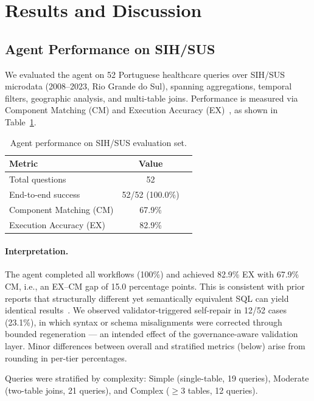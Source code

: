\documentclass[sigconf,natbib=false]{acmart}
\begin{document}
\section{Results and Discussion}
\label{sec:results}

\subsection{Agent Performance on SIH/SUS}
\label{sec:results-agent}

We evaluated the agent on 52 Portuguese healthcare queries over SIH/SUS microdata (2008--2023, Rio Grande do Sul), spanning aggregations, temporal filters, geographic analysis, and multi-table joins. Performance is measured via Component Matching (CM) and Execution Accuracy (EX)~\cite{yu2018spider}, as shown in Table~\ref{tab:agent_results}.


\begin{table}[H]
\centering
\caption{Agent performance on SIH/SUS evaluation set.}
\label{tab:agent_results}
\begin{tabular}{lcc}
\toprule
\textbf{Metric} & \textbf{Value} \\
\midrule
Total questions & 52 \\
End-to-end success & 52/52 (100.0\%) \\
Component Matching (CM) & 67.9\% \\
Execution Accuracy (EX) & 82.9\% \\
\bottomrule
\end{tabular}
\end{table}

  \paragraph{Interpretation.}
The agent completed all workflows (100\%) and achieved 82.9\% EX with 67.9\% CM, i.e., an EX--CM gap of 15.0 percentage points. This is consistent with prior reports that structurally different yet semantically equivalent SQL can yield identical results~\cite{yu2018spider}. We observed validator-triggered self-repair in 12/52 cases (23.1\%), in which syntax or schema misalignments were corrected through bounded regeneration — an intended effect of the governance-aware validation layer. Minor differences between overall and stratified metrics (below) arise from rounding in per-tier percentages.


Queries were stratified by complexity: Simple (single-table, 19 queries), Moderate (two-table joins, 21 queries), and Complex ($\geq$3 tables, 12 queries).
\end{document}
